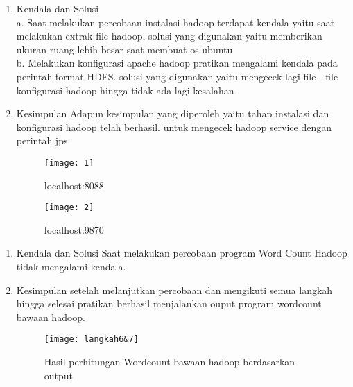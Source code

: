 \begin{enumerate}
\item Kendala dan Solusi\\
a. Saat melakukan percobaan instalasi hadoop terdapat kendala yaitu saat melakukan extrak file hadoop, solusi yang digunakan yaitu memberikan ukuran ruang lebih besar saat membuat os ubuntu\\
b. Melakukan konfigurasi apache hadoop pratikan mengalami kendala pada perintah format HDFS. solusi yang digunakan yaitu mengecek lagi file - file konfigurasi hadoop hingga tidak ada lagi kesalahan

\item Kesimpulan
Adapun kesimpulan yang diperoleh yaitu tahap instalasi dan konfigurasi hadoop telah berhasil. untuk mengecek hadoop service dengan perintah jps.
\begin{figure}[!ht]
\texttt{[image: 1]}
\caption{localhost:8088}
\label{gam:perkuliahan-22-09}
\end{figure}

\begin{figure}[!ht]
\texttt{[image: 2]}
\caption{localhost:9870}
\label{gam:perkuliahan-22-09}
\end{figure}
\end{enumerate}

\begin{enumerate}
\item Kendala dan Solusi
Saat melakukan percobaan program Word Count Hadoop tidak mengalami kendala. 
\item Kesimpulan
setelah melanjutkan percobaan dan mengikuti semua langkah hingga selesai pratikan berhasil menjalankan ouput program wordcount bawaan hadoop. 

\begin{figure}[!ht]
\texttt{[image: langkah6\&7]}
\caption{Hasil perhitungan Wordcount bawaan hadoop berdasarkan output}
\label{gam:perkuliahan-08-12}
\end{figure}
\end{enumerate}

